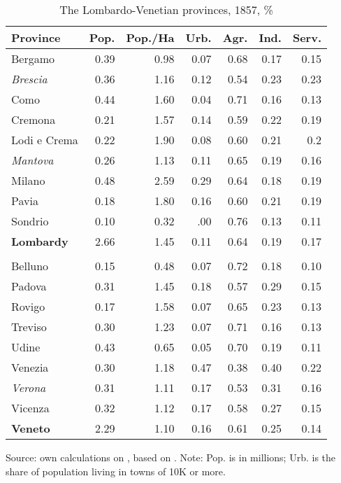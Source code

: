 \begin{table}[!h]
\caption{\label{tab:population_comp}The Lombardo-Venetian provinces, 1857, \%}
\centering

    \begin{tabular}{l r r r r r r}  
        \toprule
        Province & Pop. & Pop./Ha & Urb. & Agr. & Ind. & Serv.    \\ 
        \midrule
        Bergamo & 0.39 & 0.98 & 0.07 & 0.68 & 0.17 & 0.15 \\
        \textit{Brescia} & 0.36 & 1.16 & 0.12 & 0.54 & 0.23 & 0.23 \\
        Como & 0.44 & 1.60 & 0.04 & 0.71 & 0.16 & 0.13 \\
        Cremona & 0.21 & 1.57 & 0.14 & 0.59 & 0.22 & 0.19 \\
        Lodi e Crema & 0.22 & 1.90 & 0.08 & 0.60 & 0.21 & 0.2 \\
        \textit{Mantova} & 0.26 & 1.13 & 0.11 & 0.65 & 0.19 & 0.16 \\
        Milano & 0.48 & 2.59 & 0.29 & 0.64 & 0.18 & 0.19 \\
        Pavia & 0.18 & 1.80 & 0.16 & 0.60 & 0.21 & 0.19 \\
        Sondrio & 0.10 & 0.32 & .00 & 0.76 & 0.13 & 0.11 \\
        \textbf{Lombardy} & 2.66 & 1.45 & 0.11 & 0.64 & 0.19 & 0.17 \\
         &  & &  &  &  \\
        Belluno & 0.15 & 0.48 & 0.07 & 0.72 & 0.18 & 0.10 \\
        Padova & 0.31 &1.45 & 0.18 & 0.57 & 0.29 & 0.15 \\
        Rovigo & 0.17 & 1.58 & 0.07 & 0.65 & 0.23 & 0.13 \\
        Treviso & 0.30 & 1.23 & 0.07 & 0.71 & 0.16 & 0.13 \\
        Udine & 0.43 & 0.65 & 0.05 & 0.70 & 0.19 & 0.11 \\
        Venezia & 0.30 & 1.18 & 0.47 & 0.38 & 0.40 & 0.22 \\
        \textit{Verona} & 0.31 & 1.11 & 0.17 & 0.53 & 0.31 & 0.16 \\
        Vicenza & 0.32 & 1.12 & 0.17 & 0.58 & 0.27 & 0.15 \\
        \textbf{Veneto} & 2.29 & 1.10 & 0.16 & 0.61 & 0.25 & 0.14 \\
        \bottomrule    
    \end{tabular}
    
    Source: own calculations on \citet[][Table A1]{chilosi2021}, based on \citet{maic1862}. Note: Pop. is in millions; Urb. is the share of population living in towns of 10K or more.

\end{table}
